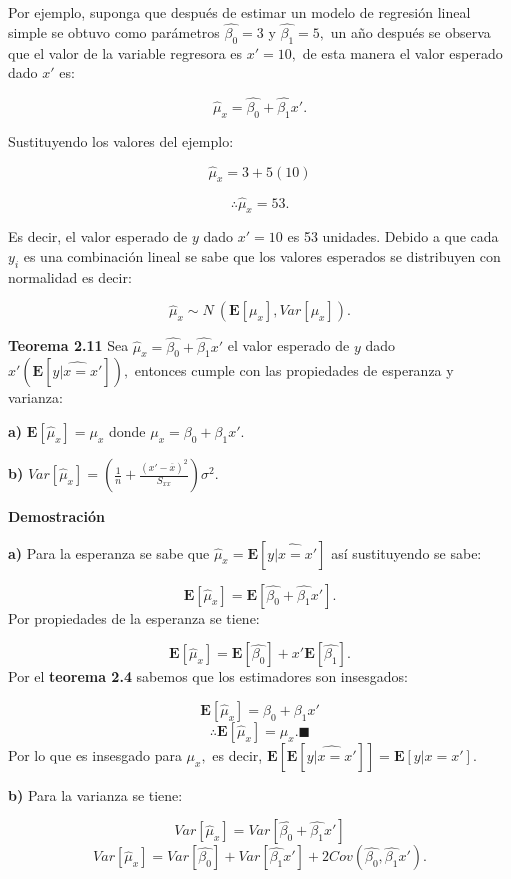 \documentclass[
  a4paper,
  oneside,
  openany]{book}
\begin{document}
Por ejemplo, suponga que después de estimar un modelo de regresión lineal simple se obtuvo como parámetros \(\hat{\beta_{0}}=3\) y \(\hat{\beta_{1}}=5,\) un año después se observa que el valor de la variable regresora es \(x'=10,\) de esta manera el valor esperado dado \(x'\) es:

\[\hat{\mu}_{x}=\hat{\beta_{0}}+\hat{\beta_{1}}x'.\]

Sustituyendo los valores del ejemplo:

\[\hat{\mu}_{x}=3+5(10)\]

\[\therefore \hat{\mu}_{x}=53.\]

Es decir, el valor esperado de \(y\) dado \(x'=10\) es 53 unidades. Debido a que cada \(y_{i}\) es una combinación lineal se sabe que los valores esperados se distribuyen con normalidad es decir:

\[\hat{\mu}_{x}\sim N \ (\mathbf{E}[\mu_{x}],Var[\mu_{x}]).\]

\textbf{Teorema 2.11} Sea \(\hat{\mu}_{x}=\hat{\beta_{0}}+\hat{\beta_{1}}x'\) el valor esperado de \(y\) dado \(x'\left( \mathbf{E}[\widehat{y|x=x'}]\right),\) entonces cumple con las propiedades de esperanza y varianza:

\textbf{a)} \(\mathbf{E}[\hat{\mu}_{x}]=\mu_{x}\) donde \(\mu_{x}=\beta_{0}+\beta_{1}x'.\)

\textbf{b)} \(Var[\hat{\mu}_{x}]=\left(\frac{1}{n}+\frac{(x'-\overline{x})^2}{S_{xx}}\right)\sigma^2.\)

\textbf{Demostración}

\textbf{a)} Para la esperanza se sabe que \(\hat{\mu}_{x}=\mathbf{E}[\widehat{y|x=x'}]\) así sustituyendo se sabe:

\[\mathbf{E}[\hat{\mu}_{x}]=\mathbf{E}\left[\hat{\beta_{0}}+\hat{\beta_{1}}x' \right].\]
Por propiedades de la esperanza se tiene:

\[\mathbf{E}[\hat{\mu}_{x}]=\mathbf{E}\left[\hat{\beta_{0}}\right]+x'\mathbf{E}\left[\hat{\beta_{1}} \right].\]
Por el \textbf{teorema 2.4} sabemos que los estimadores son insesgados:

\[\mathbf{E}[\hat{\mu}_{x}]=\beta_{0}+\beta_{1}x'\]
\[\therefore \mathbf{E}[\hat{\mu}_{x}]=\mu_{x}. \blacksquare\]
Por lo que es insesgado para \(\mu_{x},\) es decir, \(\mathbf{E}\left[\mathbf{E}[\widehat{y|x=x'}] \right]=\mathbf{E}[y|x=x'].\)

\textbf{b)} Para la varianza se tiene:

\[Var[\hat{\mu}_{x}]=Var\left[\hat{\beta_{0}}+\hat{\beta_{1}}x'\right]\]
\[Var[\hat{\mu}_{x}]=Var[\hat{\beta_{0}}]+Var[\hat{\beta_{1}}x']+2Cov(\hat{\beta_{0}},\hat{\beta_{1}}x').\]
\end{document}
